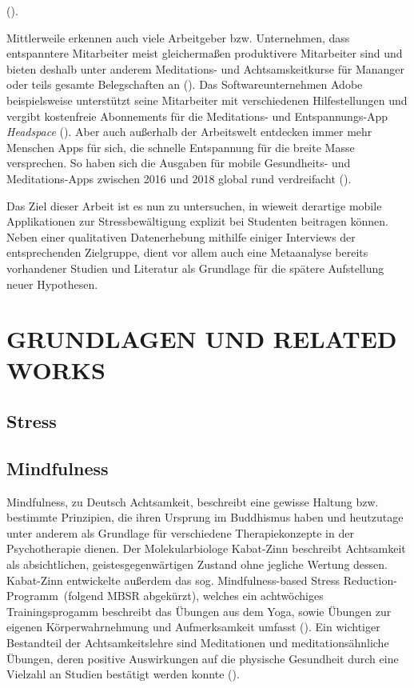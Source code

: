 \documentclass[10pt]{article}
\newcommand{\zit}[1]{(\cite{#1})}
\begin{document}
\zit{Stressbewältigung}.

Mittlerweile erkennen auch viele Arbeitgeber bzw. Unternehmen, dass entspanntere Mitarbeiter meist gleichermaßen produktivere Mitarbeiter sind und bieten deshalb unter anderem Meditations- und Achtsamskeitkurse für Mananger oder teils gesamte Belegschaften an \zit{Handelsblatt}. Das Softwareunternehmen Adobe beispielsweise unterstützt seine Mitarbeiter mit verschiedenen Hilfestellungen und vergibt kostenfreie Abonnements für die Meditations- und Entspannungs-App \textit{Headspace} \zit{Adobe}. 
Aber auch außerhalb der Arbeitswelt entdecken immer mehr Menschen Apps für sich, die schnelle Entspannung für die breite Masse versprechen. So haben sich die Ausgaben für mobile Gesundheits- und Meditations-Apps zwischen 2016 und 2018 global rund verdreifacht \zit{SteigendeNutzung}.

Das Ziel dieser Arbeit ist es nun zu untersuchen, in wieweit derartige mobile Applikationen zur Stressbewältigung explizit bei Studenten beitragen können.
Neben einer qualitativen Datenerhebung mithilfe einiger Interviews der entsprechenden Zielgruppe, dient vor allem auch eine Metaanalyse bereits vorhandener Studien und Literatur als Grundlage für die spätere Aufstellung neuer Hypothesen.
\bigbreak


\section{GRUNDLAGEN UND RELATED WORKS}

\subsection{Stress}
\subsection{Mindfulness}
Mindfulness, zu Deutsch Achtsamkeit, beschreibt eine gewisse Haltung bzw. bestimmte Prinzipien, die ihren Ursprung im Buddhismus haben und heutzutage unter anderem als Grundlage für verschiedene Therapiekonzepte in der Psychotherapie dienen. Der Molekularbiologe Kabat-Zinn beschreibt Achtsamkeit als absichtlichen, geistesgegenwärtigen Zustand ohne jegliche Wertung dessen. Kabat-Zinn entwickelte außerdem das sog. \grqq Mindfulness-based Stress Reduction-Programm\grqq\ (folgend MBSR abgekürzt), welches ein achtwöchiges Trainingsprogamm beschreibt das Übungen aus dem Yoga, sowie Übungen zur eigenen Körperwahrnehmung und Aufmerksamkeit umfasst \zit{AchtsamkeitBasics}.  Ein wichtiger Bestandteil der Achtsamkeitslehre sind Meditationen und meditationsähnliche Übungen, deren positive Auswirkungen auf die physische Gesundheit durch eine Vielzahl an Studien bestätigt werden konnte \zit{MindfulnessStudy2}.
\end{document}
